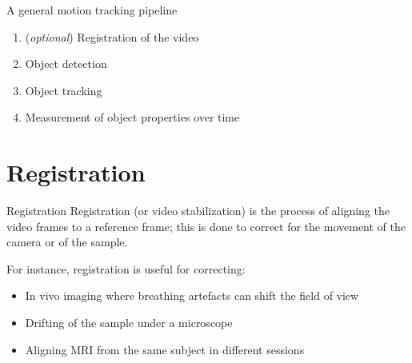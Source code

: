 \documentclass[9pt, aspectratio=169]{beamer}
\begin{document}
\begin{frame}
    {A general motion tracking pipeline}

    \begin{enumerate}
        \item (\textit{optional}) Registration of the video
        \item Object detection
        \item Object tracking
        \item Measurement of object properties over time
    \end{enumerate}
\end{frame}

\section{Registration}

\begin{frame}
    {Registration}
    Registration (or video stabilization) is the process of aligning the video frames to a reference frame; this is done to correct for the movement of the camera or of the sample.
    \pause

    For instance, registration is useful for correcting:

    \begin{itemize}
        \item In vivo imaging where breathing artefacts can shift the field of view
        \item Drifting of the sample under a microscope
        \item Aligning MRI from the same subject in different sessions
    \end{itemize}
\end{frame}
\end{document}
